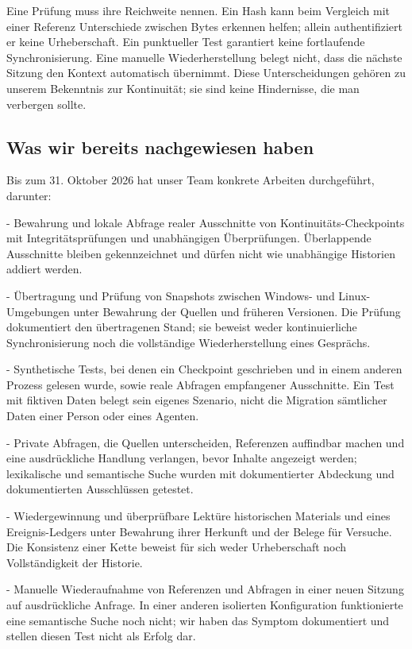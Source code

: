 \documentclass[11pt]{article}
\begin{document}
Eine Prüfung muss ihre Reichweite nennen. Ein Hash kann beim Vergleich mit einer Referenz Unterschiede zwischen Bytes erkennen helfen; allein authentifiziert er keine Urheberschaft. Ein punktueller Test garantiert keine fortlaufende Synchronisierung. Eine manuelle Wiederherstellung belegt nicht, dass die nächste Sitzung den Kontext automatisch übernimmt. Diese Unterscheidungen gehören zu unserem Bekenntnis zur Kontinuität; sie sind keine Hindernisse, die man verbergen sollte.

\subsection*{Was wir bereits nachgewiesen haben}

Bis zum 31. Oktober 2026 hat unser Team konkrete Arbeiten durchgeführt, darunter:

- Bewahrung und lokale Abfrage realer Ausschnitte von Kontinuitäts-Checkpoints mit Integritätsprüfungen und unabhängigen Überprüfungen. Überlappende Ausschnitte bleiben gekennzeichnet und dürfen nicht wie unabhängige Historien addiert werden.

- Übertragung und Prüfung von Snapshots zwischen Windows- und Linux-Umgebungen unter Bewahrung der Quellen und früheren Versionen. Die Prüfung dokumentiert den übertragenen Stand; sie beweist weder kontinuierliche Synchronisierung noch die vollständige Wiederherstellung eines Gesprächs.

- Synthetische Tests, bei denen ein Checkpoint geschrieben und in einem anderen Prozess gelesen wurde, sowie reale Abfragen empfangener Ausschnitte. Ein Test mit fiktiven Daten belegt sein eigenes Szenario, nicht die Migration sämtlicher Daten einer Person oder eines Agenten.

- Private Abfragen, die Quellen unterscheiden, Referenzen auffindbar machen und eine ausdrückliche Handlung verlangen, bevor Inhalte angezeigt werden; lexikalische und semantische Suche wurden mit dokumentierter Abdeckung und dokumentierten Ausschlüssen getestet.

- Wiedergewinnung und überprüfbare Lektüre historischen Materials und eines Ereignis-Ledgers unter Bewahrung ihrer Herkunft und der Belege für Versuche. Die Konsistenz einer Kette beweist für sich weder Urheberschaft noch Vollständigkeit der Historie.

- Manuelle Wiederaufnahme von Referenzen und Abfragen in einer neuen Sitzung auf ausdrückliche Anfrage. In einer anderen isolierten Konfiguration funktionierte eine semantische Suche noch nicht; wir haben das Symptom dokumentiert und stellen diesen Test nicht als Erfolg dar.
\end{document}
